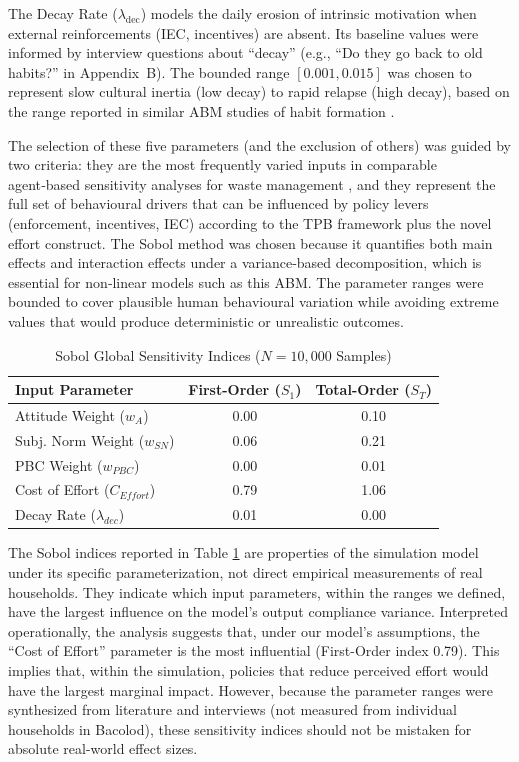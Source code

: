 The Decay Rate ($\lambda_{\text{dec}}$) models the daily erosion of intrinsic motivation when external reinforcements (IEC, incentives) are absent. Its baseline values were informed by interview questions about “decay” (e.g., “Do they go back to old habits?” in Appendix~B). The bounded range $[0.001, 0.015]$ was chosen to represent slow cultural inertia (low decay) to rapid relapse (high decay), based on the range reported in similar ABM studies of habit formation \citep{Corcoran2020, Meng2018}.

The selection of these five parameters (and the exclusion of others) was guided by two criteria: they are the most frequently varied inputs in comparable agent‑based sensitivity analyses for waste management \citep{TianReview2024, ZhengAI2022}, and they represent the full set of behavioural drivers that can be influenced by policy levers (enforcement, incentives, IEC) according to the TPB framework plus the novel effort construct. The Sobol method was chosen because it quantifies both main effects and interaction effects under a variance‑based decomposition, which is essential for non‑linear models such as this ABM. The parameter ranges were bounded to cover plausible human behavioural variation while avoiding extreme values that would produce deterministic or unrealistic outcomes.

\begin{table}[htbp]
\centering
\caption{Sobol Global Sensitivity Indices ($N=10,000$ Samples)}
\label{tab:sobol_analysis}
\begin{tabular}{l c c}
\toprule
\textbf{Input Parameter} & \textbf{First-Order ($S_{1}$)} & \textbf{Total-Order ($S_{T}$)} \\
\midrule
Attitude Weight ($w_{A}$) & 0.00 & 0.10 \\
Subj. Norm Weight ($w_{SN}$) & 0.06 & 0.21 \\
PBC Weight ($w_{PBC}$) & 0.00 & 0.01 \\
Cost of Effort ($C_{Effort}$) & 0.79 & 1.06 \\
Decay Rate ($\lambda_{dec}$) & 0.01 & 0.00 \\
\bottomrule
\end{tabular}
\end{table}

The Sobol indices reported in Table \ref{tab:sobol_analysis} are properties of the simulation model under its specific parameterization, not direct empirical measurements of real households. They indicate which input parameters, within the ranges we defined, have the largest influence on the model's output compliance variance. Interpreted operationally, the analysis suggests that, under our model's assumptions, the ``Cost of Effort'' parameter is the most influential (First-Order index 0.79). This implies that, within the simulation, policies that reduce perceived effort would have the largest marginal impact. However, because the parameter ranges were synthesized from literature and interviews (not measured from individual households in Bacolod), these sensitivity indices should not be mistaken for absolute real-world effect sizes. 

